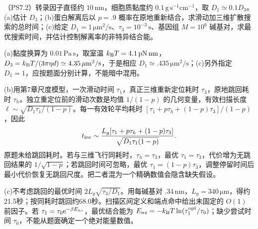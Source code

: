 \begin{exercise}
（PS7.2）转录因子直径约 $10\,\mathrm{nm}$，细胞质黏度约 $0.1\,\mathrm{g\,s^{-1}cm^{-1}}$，取 $D_1\simeq0.1D_3$。(a)估计 $D_3$；(b)蛋白解离后以 $p=.9$ 概率在原地重新结合，求滑动加三维扩散搜索的总时间；(c)给定 $D_1=1\,\mathrm{\mu m^2/s}$、$\tau_3=10^{-3}\,\mathrm s$、基因组 $M=10^6$ 碱基对，求最优搜索时间，并估计控制解离率的非特异结合能。
\end{exercise}
\begin{solution}
(a)黏度换算为 $0.01\,\mathrm{Pa\,s}$，取室温 $k_{\mathrm B} T=4.1\,\mathrm{pN\,nm}$，$D_3=k_{\mathrm B} T/(3\pi\eta d)\simeq4.35\,\mathrm{\mu m^2/s}$，于是相应 $D_1\simeq.435\,\mathrm{\mu m^2/s}$；(c)另外指定 $D_1=1$，应按题面分别计算，不能暗中混用。

(b)用第7章尺度模型，一次滑动时间 $\tau_1$，真正三维重新定位耗时 $\tau_3$，原地跳回耗时 $\tau_h$。独立重定位前的滑动次数是均值 $1/(1-p)$ 的几何变量，有效扫描长度 $\ell\sim\sqrt{D_1\tau_1/(1-p)}$。每一有效轮平均耗时 $[\tau_1+p\tau_h+(1-p)\tau_3]/(1-p)$，因此
\[
t_{\rm loc}\sim\frac{L_g[\tau_1+p\tau_h+(1-p)\tau_3]}{\sqrt{D_1\tau_1(1-p)}}.
\]
原题未给跳回耗时。若与三维飞行同耗时，$\tau_h=\tau_3$，最优 $\tau_1=\tau_3$，代价增为无跳回结果的 $1/\sqrt{1-p}$；若跳回时间可忽略，最优 $\tau_1=(1-p)\tau_3$，调整停留时间后最小代价恢复无跳回尺度。把二者混为一个精确数值会隐含缺失假设。

(c)不考虑跳回的最优时间 $2L_g\sqrt{\tau_3/D_1}$。用每碱基对 $.34\,\mathrm{nm}$，$L_g=340\,\mathrm{\mu m}$，得约21.5秒；按同耗时跳回约68.0秒。扫描区间定义和端点命中给出未固定的 $O(1)$ 前因子。若 $\tau_1=\tau_0\mathrm e^{-\beta E_{ns}}$，最优结合能为 $E_{ns}=-k_{\mathrm B} T\ln(\tau_1^{\rm opt}/\tau_0)$；缺少尝试时间 $\tau_0$，不能从题面确定一个绝对能量数值。
\end{solution}

